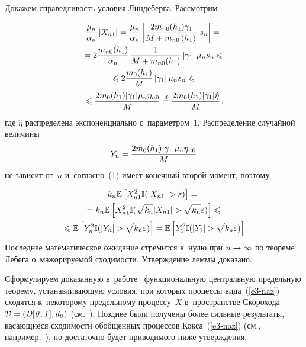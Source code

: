 \begin{multicols}{2}
Докажем справедливость условия Линдеберга. Рассмотрим

\vspace*{-6pt}

\noindent
\begin{multline*}
\displaystyle\frac{\displaystyle \mu_n\mathstrut}{\displaystyle \alpha_n\mathstrut}\left\vert X_{n1}\right\vert = 
 \displaystyle\frac{\displaystyle \mu_n\mathstrut}{\displaystyle \alpha_n\mathstrut}\left\vert \displaystyle\frac{\displaystyle 2 m_{n0}(h_1)\gamma_{1}\mathstrut}{\displaystyle M+ m_{n0}
 \left(h_1\right)\mathstrut}\,s_n\right\vert = {}\\
 {}=
 2\displaystyle\frac{\displaystyle m_{n0}(h_1)\mathstrut}{\displaystyle \alpha_n\mathstrut}\,\displaystyle\frac{\displaystyle 1\mathstrut}{\displaystyle M+ m_{n0}(h_1)\mathstrut}\left\vert \gamma_1\right\vert
 \mu_ns_n \leqslant {}\\
{}\leqslant 2\displaystyle\frac{\displaystyle m_0(h_1)\mathstrut}{\displaystyle M\mathstrut}\left\vert \gamma_1\right\vert \mu_ns_n
\leqslant {}\\
{}\leqslant \displaystyle\frac{\displaystyle 2m_0(h_1)|\gamma_1|\mu_n\eta_{n0}\mathstrut}{\displaystyle M\mathstrut} \stackrel{d}= 
\displaystyle\frac{\displaystyle 2m_0(h_1)|\gamma_1|\hat{\eta}\mathstrut}{\displaystyle M\mathstrut}\,,
\end{multline*}
где $\hat{\eta}$ распределена экспоненциально с~па\-ра\-мет\-ром~1. 
Распределение случайной величины 
$$
Y_n =   \displaystyle\frac{\displaystyle {2m_0(h_1)|\gamma_1|\mu_n\eta_{n0}}\mathstrut}{\displaystyle M\mathstrut}
$$ 
не зависит от~$n$ и~согласно~(1) имеет конечный второй момент, поэтому

\noindent
\begin{multline*}
k_n\mathbb{E}\left[X_{n1}^2\mathbb{I}(|X_{n1}|>\varepsilon)\right] ={}\\
{}= 
k_n\mathbb{E}\left[X_{n1}^2\mathbb{I}(\sqrt{k_n}|X_{n1}|>
\sqrt{k_n}\varepsilon)\right] \leqslant {} \\
{}\leqslant \mathbb{E}\left[Y_{n}^2\mathbb{I}(|Y_{n}|>
\sqrt{k_n}\varepsilon)\right]
= \mathbb{E}\left[Y_{1}^2\mathbb{I}(|Y_{1}|>
\sqrt{k_n}\varepsilon)\right].\hspace*{-3.79228pt}
\end{multline*}
Последнее математическое ожидание стремится к~нулю при $n\hm\rightarrow\infty$ по 
тео\-ре\-ме Лебега о~ма\-жо\-ри\-ру\-емой сходимости. Утверждение леммы доказано.

\vspace*{2pt}

Сформулируем доказанную в~работе~\cite{fourth} функ\-циональную центральную 
предельную тео\-ре\-му, устанавливающую условия, при которых процессы вида~(\ref{e3-naz}) 
сходятся к~некоторому предельному процессу~$X$ в~про\-стран\-ст\-ве Скорохода 
$\mathcal{D}\hm = \mathit{(D[0,1], d_0)}$ (см.~\cite[гл.~3]{five}). 
Позднее были получены более сильные результаты, касающиеся схо\-ди\-мости обобщенных 
процессов Кокса~(\ref{e3-naz}) (см., на\-при\-мер,~\cite{Korolev_FLT}), 
но достаточно будет приводимого ниже утверж\-де\-ния.
{ %

}
\end{multicols}
